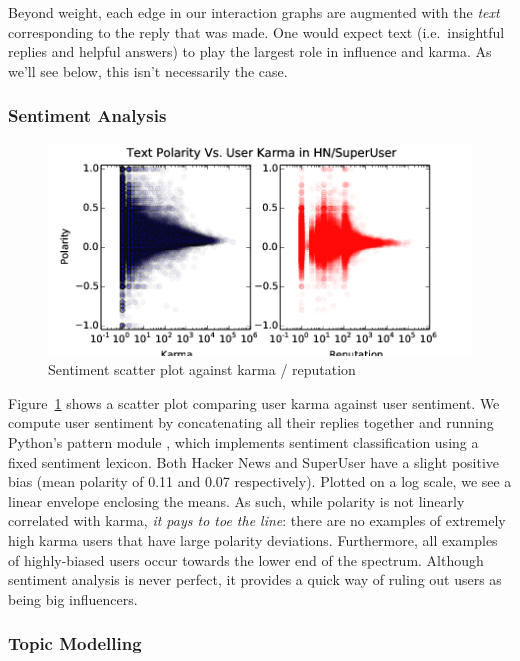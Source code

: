 \documentclass[11pt]{article}
\begin{document}
Beyond weight, each edge in our interaction graphs are augmented with the
\textit{text} corresponding to the reply that was made. One would expect 
text (i.e.\ insightful replies and helpful answers) to play the largest role 
in influence and karma. As we'll see below, this isn't necessarily the case.

\subsubsection{Sentiment Analysis}
\label{sec:sentiment}
\begin{figure}[h]
\centering
\includegraphics[width=\linewidth]{text_polarity-png}
\caption{Sentiment scatter plot against karma / reputation}
\label{fig:sentiment}
\end{figure}

Figure~\ref{fig:sentiment} shows a scatter plot comparing user karma
against user sentiment. We compute user sentiment by concatenating all
their replies together and running Python's pattern module \citet{de2012pattern}, 
which implements sentiment classification using a fixed sentiment lexicon.  Both
Hacker News and SuperUser have a slight positive bias (mean polarity of 0.11 and
0.07 respectively). Plotted on a log scale, we see a linear envelope enclosing
the means. As such, while polarity is not linearly correlated with karma,
\textit{it pays to toe the line}: there are no examples of extremely high karma
users that have large polarity deviations. Furthermore, all examples of
highly-biased users occur towards the lower end of the spectrum. Although
sentiment analysis is never perfect, it provides a quick way of ruling out users
as being big influencers.

\subsubsection{Topic Modelling}
\end{document}
